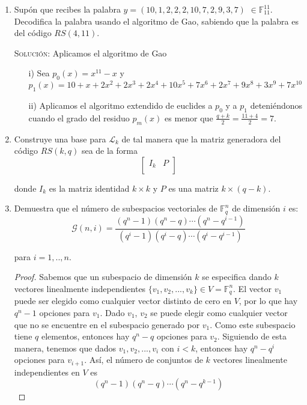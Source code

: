 \documentclass[letterpaper,11pt]{article}
\begin{document}
\begin{enumerate}
    \newpage
    \item Supón que recibes la palabra $y = (10, 1, 2, 2, 2, 10, 7, 2, 9, 3, 7)$
    $\in \mathbb{F}^{11}_{11}$. Decodifica la palabra usando el algoritmo de
    Gao, sabiendo que la palabra es del código $RS(4,11)$.
    
    \textsc{Solución:} Aplicamos el algoritmo de Gao
    \begin{enumerate}
        \item[i)] Sea $p_{0}(x) = x^{11}-x$ y $p_{1}(x) = 10 + x + 2x^{2} 
        + 2x^{3} + 2x^{4} + 10x^{5} + 7x^{6} + 2x^{7} + 9x^{8} + 3x^{9} 
        + 7x^{10}$
        \item[ii)] Aplicamos el algoritmo extendido de euclides a $p_{0}$ y a 
        $p_{1}$ deteniéndonos cuando el grado del residuo $p_{m}(x)$ es menor
        que $\frac{q+k}{2} = \frac{11+4}{2} = 7$.
    \end{enumerate}

    \item Construye una base para $\mathcal{L}_{k}$ de tal manera que la matriz
    generadora del código $RS(k, q)$ sea de la forma 
    \begin{equation}
    \begin{bmatrix}
    I_{k} & P\\
    \end{bmatrix}
    \end{equation}
    
    donde $I_{k}$ es la matriz identidad $k \times k$ y $P$ es una matriz 
    $k \times (q-k)$. 
    
    \item Demuestra que el número de subespacios vectoriales de 
    $\mathbb{F}^{n}_{q}$ de dimensión $i$ es: 
    \begin{equation}
        \mathcal{G}(n, i) = \frac{(q^{n}-1)(q^{n}-q)\cdots(q^{n}-q^{i-1})}
        {(q^{i}-1)(q^{i}-q)\cdots(q^{i}-q^{i-1})}
    \end{equation}
    
    para $i = 1,.., n$.
    
    \begin{proof}
        Sabemos que un subespacio de dimensión $k$ se especifica dando $k$
        vectores linealmente independientes $\{v_{1}, v_{2}, ..., v_{k}\}
        \in V = \mathbb{F}^{n}_{q}$. El vector $v_{1}$ puede ser elegido como 
        cualquier vector distinto de cero en $V$, por lo que hay $q^{n}-1$ 
        opciones para $v_{1}$. Dado $v_{1}$, $v_{2}$ se puede elegir como 
        cualquier vector que no se encuentre en el subespacio generado por 
        $v_{1}$. Como este subespacio tiene $q$ elementos, entonces hay 
        $q^{n} - q$ opciones para $v_{2}$. Siguiendo de esta manera, tenemos 
        que dados $v_{1}, v_{2},..., v_{i}$ con $i < k$, entonces hay 
        $q^{n}-q^{i}$ opciones para $v_{i+1}$. Así, el número de conjuntos de 
        $k$ vectores linealmente independientes en $V$ es
        \begin{equation}
            (q^{n}-1)(q^{n}-q)\cdots(q^{n}-q^{k-1})
        \end{equation}
        

\end{proof}
\end{enumerate}
\end{document}
